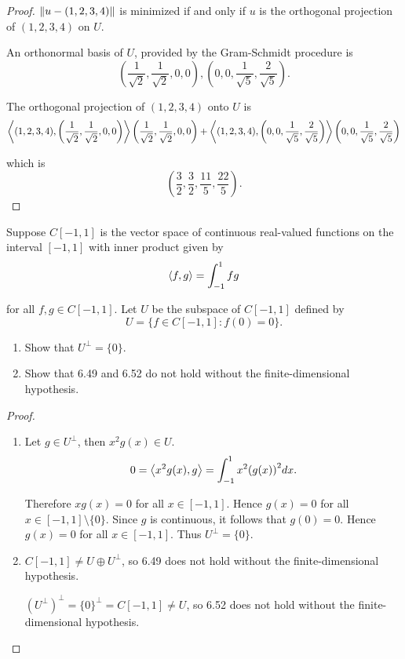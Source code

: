 \begin{proof}
    $\left\Vert{u - (1, 2, 3, 4)}\right\Vert$ is minimized if and only if $u$ is the orthogonal projection of $(1, 2, 3, 4)$ on $U$.

    An orthonormal basis of $U$, provided by the Gram-Schmidt procedure is
    \[
        \left(\frac{1}{\sqrt{2}}, \frac{1}{\sqrt{2}}, 0, 0\right), \left(0, 0, \frac{1}{\sqrt{5}}, \frac{2}{\sqrt{5}}\right).
    \]

    The orthogonal projection of $(1, 2, 3, 4)$ onto $U$ is
    \[
        \left\langle{(1, 2, 3 ,4), \left(\frac{1}{\sqrt{2}}, \frac{1}{\sqrt{2}}, 0, 0\right)}\right\rangle\left(\frac{1}{\sqrt{2}}, \frac{1}{\sqrt{2}}, 0, 0\right) + \left\langle{(1, 2, 3, 4), \left(0, 0, \frac{1}{\sqrt{5}}, \frac{2}{\sqrt{5}}\right)}\right\rangle\left(0, 0, \frac{1}{\sqrt{5}}, \frac{2}{\sqrt{5}}\right)
    \]

    which is
    \[
        \left( \frac{3}{2}, \frac{3}{2}, \frac{11}{5}, \frac{22}{5} \right).
    \]
\end{proof}
\newpage

\begin{exercise}
    Suppose $C[-1, 1]$ is the vector space of continuous real-valued functions on the interval $[-1, 1]$ with inner product given by
    \[
        \left\langle{f, g}\right\rangle = \int^{1}_{-1}fg
    \]

    for all $f, g\in C[-1, 1]$. Let $U$ be the subspace of $C[-1, 1]$ defined by
    \[
        U = \{ f\in C[-1, 1]: f(0) = 0 \}.
    \]

    \begin{enumerate}[label={(\alph*)}]
        \item Show that $U^{\bot} = \{0\}$.
        \item Show that 6.49 and 6.52 do not hold without the finite-dimensional hypothesis.
    \end{enumerate}
\end{exercise}

\begin{proof}
    \begin{enumerate}[label={(\alph*)}]
        \item Let $g\in U^{\bot}$, then $x^{2}g(x)\in U$.
              \[
                  0 = \left\langle{x^{2}g(x), g}\right\rangle = \int^{1}_{-1}x^{2}{(g(x))}^{2}dx.
              \]

              Therefore $xg(x) = 0$ for all $x\in[-1, 1]$. Hence $g(x) = 0$ for all $x\in[-1,1]\setminus\{0\}$. Since $g$ is continuous, it follows that $g(0) = 0$. Hence $g(x) = 0$ for all $x\in [-1,1]$. Thus $U^{\bot} = \{0\}$.
        \item $C[-1, 1]\ne U\oplus U^{\bot}$, so 6.49 does not hold without the finite-dimensional hypothesis.

              ${\left(U^{\bot}\right)}^{\bot} = {\{0\}}^{\bot} = C[-1, 1]\ne U$, so 6.52 does not hold without the finite-dimensional hypothesis.
    \end{enumerate}
\end{proof}
\newpage

